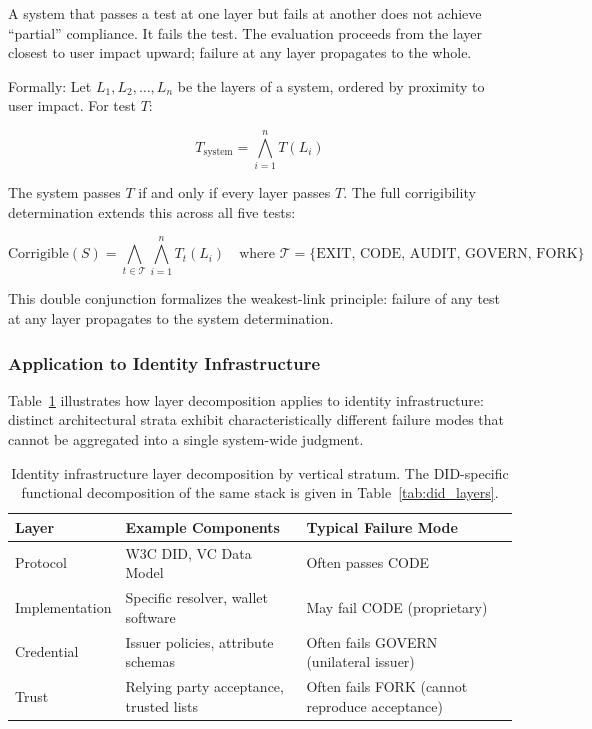 \documentclass{article}
\begin{document}
A system that passes a test at one layer but fails at another does not achieve ``partial'' compliance. It fails the test. The evaluation proceeds from the layer closest to user impact upward; failure at any layer propagates to the whole.

Formally: Let $L_1, L_2, \ldots, L_n$ be the layers of a system, ordered by proximity to user impact. For test $T$:

\begin{equation}
T_{\text{system}} = \bigwedge_{i=1}^{n} T(L_i)
\label{eq:layer-propagation}
\end{equation}

The system passes $T$ if and only if every layer passes $T$. The full corrigibility determination extends this across all five tests:

\begin{equation}
\text{Corrigible}(S) = \bigwedge_{t \in \mathcal{T}} \bigwedge_{i=1}^{n} T_t(L_i) \quad \text{where } \mathcal{T} = \{\text{EXIT, CODE, AUDIT, GOVERN, FORK}\}
\label{eq:full-corrigibility}
\end{equation}

This double conjunction formalizes the weakest-link principle: failure of any test at any layer propagates to the system determination.

\subsubsection{Application to Identity Infrastructure}

Table~\ref{tab:identity_layers} illustrates how layer decomposition applies to identity infrastructure: distinct architectural strata exhibit characteristically different failure modes that cannot be aggregated into a single system-wide judgment.

\begin{table}[htbp]
\centering
\small
\begin{tabular}{@{}llp{5cm}@{}}
\toprule
\textbf{Layer} & \textbf{Example Components} & \textbf{Typical Failure Mode} \\
\midrule
Protocol & W3C DID, VC Data Model & Often passes CODE \\
Implementation & Specific resolver, wallet software & May fail CODE (proprietary) \\
Credential & Issuer policies, attribute schemas & Often fails GOVERN (unilateral issuer) \\
Trust & Relying party acceptance, trusted lists & Often fails FORK (cannot reproduce acceptance) \\
\bottomrule
\end{tabular}
\caption{Identity infrastructure layer decomposition by vertical stratum. The DID-specific functional decomposition of the same stack is given in Table~\ref{tab:did_layers}.}
\label{tab:identity_layers}
\end{table}
\end{document}
